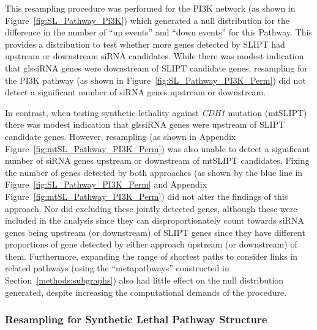 This resampling procedure was performed for the PI3K network (as shown in Figure~\ref{fig:SL_Pathway_Pi3K}) which generated a null distribution for the difference in the number of ``up events'' and ``down events'' for this Pathway. This provides a distribution to test whether more genes detected by \gls{SLIPT} had upstream or downstream \gls{siRNA} candidates. While there was modest indication that gls{siRNA} genes were downstream of \gls{SLIPT} candidate genes, resampling for the PI3K pathway (as shown in Figure~\ref{fig:SL_Pathway_PI3K_Perm}) did not detect a significant number of \gls{siRNA} genes upstream or downstream.

In contrast, when testing synthetic lethality against \textit{CDH1} mutation (mtSLIPT) there was modest indication that gls{siRNA} genes were upstream of \gls{SLIPT} candidate genes. However, resampling (as shown in Appendix Figure~\ref{fig:mtSL_Pathway_PI3K_Perm}) was also unable to detect a significant number of \gls{siRNA} genes upstream or downstream of mtSLIPT candidates. Fixing the number of genes detected by both approaches (as shown by the blue line in Figure~\ref{fig:SL_Pathway_PI3K_Perm} and Appendix Figure~\ref{fig:mtSL_Pathway_PI3K_Perm}) did not alter the findings of this approach. Nor did excluding these jointly detected genes, although these were included in the analysis since they can disproportionately count towards \gls{siRNA} genes being upstream (or downstream) of \gls{SLIPT} genes since they have different proportions of gene detected by either approach upstream (or downstream) of them. Furthermore, expanding the range of shortest paths to consider links in related pathways (using the ``metapathways'' constructed in Section~\ref{methods:subgraphs}) also had little effect on the null distribution generated, despite increasing the computational demands of the procedure.


\FloatBarrier

\subsubsection{Resampling for Synthetic Lethal Pathway Structure}  \label{chapt4:Structure_Perm}

